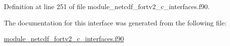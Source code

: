 Definition at line 251 of file module\+\_\+netcdf\+\_\+fortv2\+\_\+c\+\_\+interfaces.\+f90.



The documentation for this interface was generated from the following file\+:\begin{DoxyCompactItemize}
\item 
\hyperlink{module__netcdf__fortv2__c__interfaces_8f90}{module\+\_\+netcdf\+\_\+fortv2\+\_\+c\+\_\+interfaces.\+f90}\end{DoxyCompactItemize}

